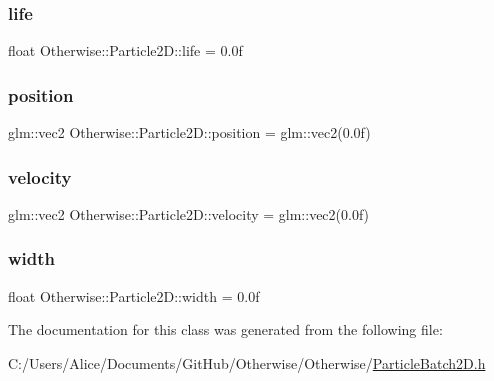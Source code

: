 \subsubsection{\texorpdfstring{life}{life}}
{\footnotesize\ttfamily float Otherwise\+::\+Particle2\+D\+::life = 0.\+0f}

\mbox{\label{class_otherwise_1_1_particle2_d_aaaeaafa4501a28ca70bace09086c336d}} 
\subsubsection{\texorpdfstring{position}{position}}
{\footnotesize\ttfamily glm\+::vec2 Otherwise\+::\+Particle2\+D\+::position = glm\+::vec2(0.\+0f)}

\mbox{\label{class_otherwise_1_1_particle2_d_a1259e5e0fef4cd2e727eeca0812c4a75}} 
\subsubsection{\texorpdfstring{velocity}{velocity}}
{\footnotesize\ttfamily glm\+::vec2 Otherwise\+::\+Particle2\+D\+::velocity = glm\+::vec2(0.\+0f)}

\mbox{\label{class_otherwise_1_1_particle2_d_a11d1e450a3b1c05a7197fab0d4297a09}} 
\subsubsection{\texorpdfstring{width}{width}}
{\footnotesize\ttfamily float Otherwise\+::\+Particle2\+D\+::width = 0.\+0f}



The documentation for this class was generated from the following file\+:\begin{DoxyCompactItemize}
\item 
C\+:/\+Users/\+Alice/\+Documents/\+Git\+Hub/\+Otherwise/\+Otherwise/\hyperlink{_particle_batch2_d_8h}{Particle\+Batch2\+D.\+h}\end{DoxyCompactItemize}
